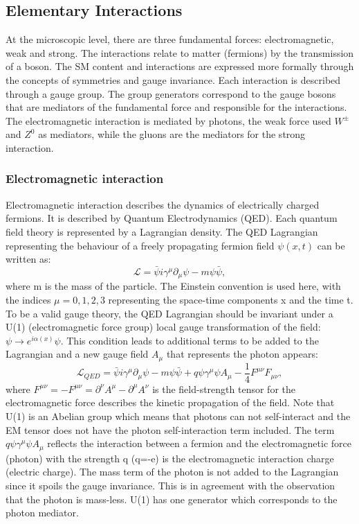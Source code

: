 \subsection{Elementary Interactions}
\label{chap1:SM:EI}
At the microscopic level, there are three fundamental forces: electromagnetic, weak and strong. The interactions relate to matter (fermions) by the transmission of a boson. The SM content and interactions are expressed more formally through the concepts of symmetries and gauge invariance. Each interaction is described through a gauge group. The group generators correspond to the gauge bosons that are mediators of the fundamental force and responsible for the interactions. The electromagnetic interaction is mediated by photons, the weak force used $W^{\pm}$ and $Z^{0}$ as mediators, while the gluons are the mediators for the strong interaction.

\subsubsection{Electromagnetic interaction}
Electromagnetic interaction describes the dynamics of electrically charged fermions. It is described by Quantum Electrodynamics (QED). Each quantum field theory is represented by a Lagrangian density. The QED Lagrangian representing the behaviour of a freely propagating fermion field $\psi (x, t)$ can be written as: 
\begin{equation}
    \mathcal{L} = \bar{\psi}i\gamma^\mu\partial_\mu\psi - m\psi\bar{\psi},
\end{equation}
where m is the mass of the particle. The Einstein convention is used here, with the indices $\mu= 0,1,2,3$ representing the space-time components x and the time t. \\ 
To be a valid gauge theory, the QED Lagrangian should be invariant under a U(1) (electromagnetic force group) local gauge transformation of the field: $\psi\rightarrow e^{i\alpha(x)}\psi$. This condition leads to additional terms to be added to the Lagrangian and a new gauge field $A_{\mu}$ that represents the photon appears:
\begin{equation}
    \mathcal{L}_{QED} = \bar{\psi}i\gamma^\mu\partial_\mu\psi - m\psi\bar{\psi} + q\psi\gamma^{\mu}\psi A_{\mu} - \frac{1}{4}F^{\mu\nu}F_{\mu\nu},
\end{equation}
where $F^{\mu\nu} = - F^{\mu\nu} = \partial^{\nu}A^{\mu} - \partial^{\mu}A^{\nu}$ is the field-strength tensor for the electromagnetic force describes the kinetic propagation of the field. Note that U(1) is an Abelian group which means that photons can not self-interact and the EM tensor does not have the photon self-interaction term included. The term $q\psi\gamma^{\mu}\psi A_{\mu}$ reflects the interaction between a fermion and the electromagnetic force (photon) with the strength q (q=-e) is the electromagnetic interaction charge (electric charge). The mass term of the photon is not added to the Lagrangian since it spoils the gauge invariance. This is in agreement with the observation that the photon is mass-less. U(1) has one generator which corresponds to the photon mediator.


